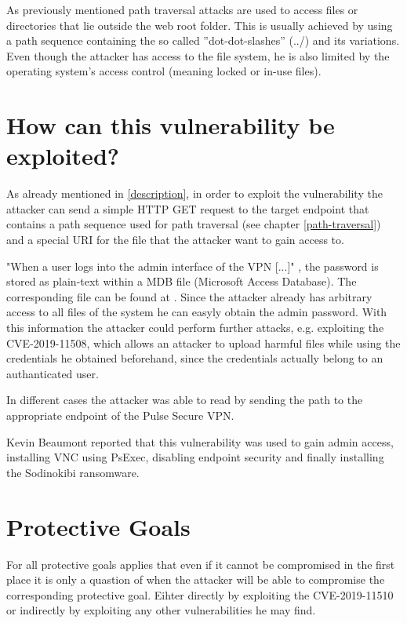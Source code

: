 As previously mentioned path traversal attacks are used to access files or directories that lie outside the web root folder. This is usually achieved by using a path sequence containing the so called ''dot-dot-slashes'' (../) and its variations. Even though the attacker has access to the file system, he is also limited by the operating system's access control (meaning locked or in-use files). \autocite{OWASP-PathTraversal:online}

\section{How can this vulnerability be exploited?}
\label{sec:exploitation}
As already mentioned in \ref{description}, in order to exploit the vulnerability the attacker can send a simple HTTP GET request to the target endpoint that contains a path sequence used for path traversal (see chapter \ref{path-traversal}) and a special URI for the file that the attacker want to gain access to. \autocite{Tenable2:online}

"When a user logs into the admin interface of the VPN [...]" \autocite{Tenable2:online}, the password is stored as plain-text within a MDB file (Microsoft Access Database). The corresponding file can be found at . Since the attacker already has arbitrary access to all files of the system he can easyly obtain the admin password. With this information the attacker could perform further attacks, e.g. exploiting the CVE-2019-11508, which allows an attacker to upload harmful files while using the credentials he obtained beforehand, since the credentials actually belong to an authanticated user. \autocite{Tenable2:online}

In different cases the attacker was able to read  by sending the path  to the appropriate endpoint of the Pulse Secure VPN. \autocite{ExploitExample:online}

Kevin Beaumont reported that this vulnerability was used to gain admin access, installing VNC using PsExec, disabling endpoint security and finally installing the Sodinokibi ransomware.\autocite{Tenable1:online}

\section{Protective Goals}
\label{protective-goals}
For all protective goals applies that even if it cannot be compromised in the first place it is only a quastion of when the attacker will be able to compromise the corresponding protective goal. Eihter directly by exploiting the CVE-2019-11510 or indirectly by exploiting any other vulnerabilities he may find.

